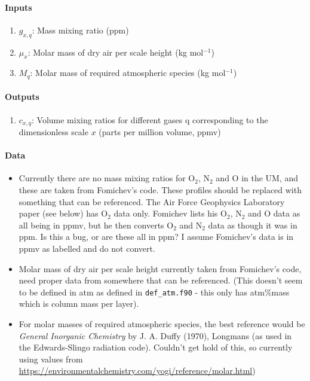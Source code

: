    \paragraph{Inputs}
   \begin{enumerate}
   \item $g_{x,q}$: Mass mixing ratio (ppm)
   \item $\mu_x$: Molar mass of dry air per scale height (kg mol$^{-1}$)
   \item $M_q$: Molar mass of required atmospheric species (kg mol$^{-1}$)
   \end{enumerate}

   \paragraph{Outputs}
   \begin{enumerate}
   \item $c_{x,q}$: Volume mixing ratios for different gases q corresponding 
     to the dimensionless scale $x$ (parts per million volume, ppmv)
   \end{enumerate}

   \paragraph{Data}
   \begin{itemize}
   \item Currently there are no mass mixing ratios for O$_2$, N$_2$
     and O in the UM, and these are taken from Fomichev's code. These
     profiles should be replaced with something that can be
     referenced. The Air Force Geophysics Laboratory paper (see below)
     has O$_2$ data only. Fomichev lists his O$_2$, N$_2$ and O data
     as all being in ppmv, but he then converts O$_2$ and N$_2$ data
     as though it was in ppm. Is this a bug, or are these all in ppm?
     I assume Fomichev's data is in ppmv as labelled and do not convert.
   \item Molar mass of dry air per scale height currently taken from 
     Fomichev's code, need proper data from somewhere that can be 
     referenced. (This doesn't seem to be defined in atm as defined in 
     {\tt def\_atm.f90} - this only has atm\%mass which is column mass per layer). 
   \item For molar masses of required atmospheric species, the best
     reference would be \textit{General Inorganic Chemistry} by
     J. A. Duffy (1970), Longmans (as used in the Edwards-Slingo
     radiation code). Couldn't get hold of this, so currently using
     values from \\
     \url{https://environmentalchemistry.com/yogi/reference/molar.html})
    \end{itemize}

